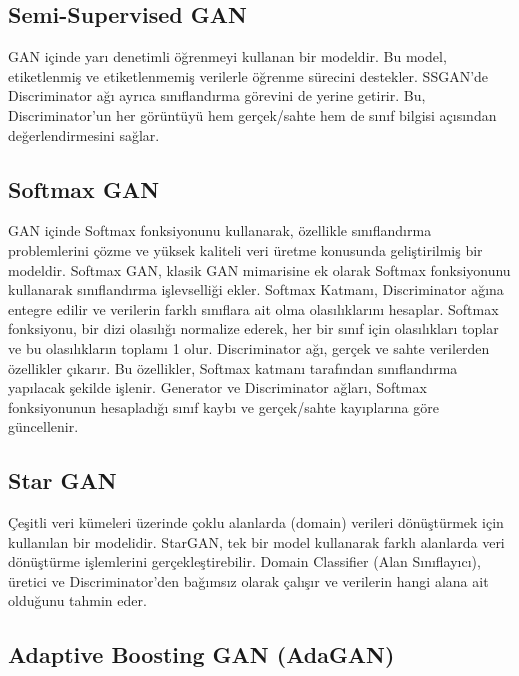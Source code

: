 \newpage

\subsection{Semi-Supervised GAN}

GAN içinde yarı denetimli öğrenmeyi kullanan bir modeldir. Bu model, etiketlenmiş ve etiketlenmemiş verilerle öğrenme sürecini destekler. SSGAN'de Discriminator ağı ayrıca sınıflandırma görevini de yerine getirir. Bu, Discriminator'un her görüntüyü hem gerçek/sahte hem de sınıf bilgisi açısından değerlendirmesini sağlar.

\newpage

\subsection{Softmax GAN}

GAN içinde Softmax fonksiyonunu kullanarak, özellikle sınıflandırma problemlerini çözme ve yüksek kaliteli veri üretme konusunda geliştirilmiş bir modeldir. Softmax GAN, klasik GAN mimarisine ek olarak Softmax fonksiyonunu kullanarak sınıflandırma işlevselliği ekler. Softmax Katmanı, Discriminator ağına entegre edilir ve verilerin farklı sınıflara ait olma olasılıklarını hesaplar. Softmax fonksiyonu, bir dizi olasılığı normalize ederek, her bir sınıf için olasılıkları toplar ve bu olasılıkların toplamı 1 olur. Discriminator ağı, gerçek ve sahte verilerden özellikler çıkarır. Bu özellikler, Softmax katmanı tarafından sınıflandırma yapılacak şekilde işlenir. Generator ve Discriminator ağları, Softmax fonksiyonunun hesapladığı sınıf kaybı ve gerçek/sahte kayıplarına göre güncellenir.

\newpage

\subsection{Star GAN}

Çeşitli veri kümeleri üzerinde çoklu alanlarda (domain) verileri dönüştürmek için kullanılan bir modelidir. StarGAN, tek bir model kullanarak farklı alanlarda veri dönüştürme işlemlerini gerçekleştirebilir. Domain Classifier (Alan Sınıflayıcı), üretici ve Discriminator'den bağımsız olarak çalışır ve verilerin hangi alana ait olduğunu tahmin eder. 

\newpage

\subsection{Adaptive Boosting GAN (AdaGAN)}

